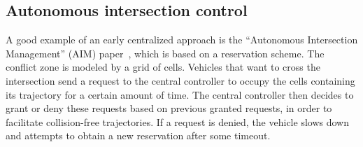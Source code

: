 \documentclass[a4paper]{article}
\theoremstyle{definition}
\theoremstyle{plain}
\begin{document}

\subsection*{Autonomous intersection control}

A good example of an early centralized approach is the ``Autonomous Intersection
Management'' (AIM) paper~\cite{dresnerMultiagentApproachAutonomous2008}, which
is based on a reservation scheme. The conflict zone is modeled by a grid of
cells. Vehicles that want to cross the intersection send a request to the
central controller to occupy the cells containing its trajectory for a certain
amount of time. The central controller then decides to grant or deny these
requests based on previous granted requests, in order to facilitate
collision-free trajectories. If a request is denied, the vehicle slows down and
attempts to obtain a new reservation after some timeout.

\end{document}
